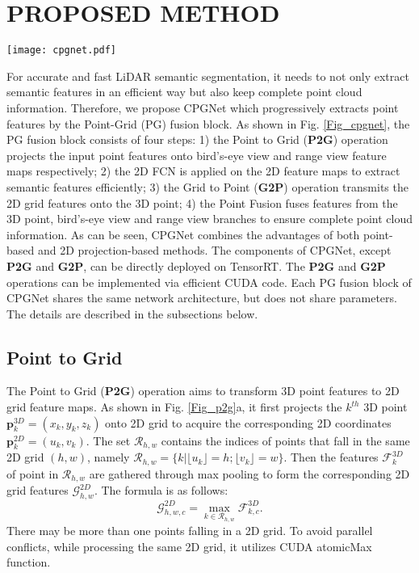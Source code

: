 \documentclass[letterpaper, 10 pt, conference]{ieeeconf}
\begin{document}
\section{PROPOSED METHOD}

\begin{figure*}[t]
\centering
\texttt{[image: cpgnet.pdf]}
\caption{The Point-Grid (PG) fusion block. It takes the point features from the last PG fusion block as input and undergoes the point, bird’s-eye view and range view branches, respectively. The output point features are acquired by fusing features from the three branches.}
\label{Fig_cpgnet}
\end{figure*}

For accurate and fast LiDAR semantic segmentation, it needs to not only extract semantic features in an efficient way but also keep complete point cloud information. Therefore, we propose CPGNet which progressively extracts point features by the Point-Grid (PG) fusion block. As shown in Fig. \ref{Fig_cpgnet}, the PG fusion block consists of four steps: 1) the Point to Grid ({\bf P2G}) operation projects the input point features onto bird’s-eye view and range view feature maps respectively; 2) the 2D FCN is applied on the 2D feature maps to extract semantic features efficiently; 3) the Grid to Point ({\bf G2P}) operation transmits the 2D grid features onto the 3D point; 4) the Point Fusion fuses features from the 3D point, bird’s-eye view and range view branches to ensure complete point cloud information. As can be seen, CPGNet combines the advantages of both point-based and 2D projection-based methods. The components of CPGNet, except {\bf P2G} and {\bf G2P}, can be directly deployed on TensorRT. The {\bf P2G} and {\bf G2P} operations can be implemented via efficient CUDA code. Each PG fusion block of CPGNet shares the same network architecture, but does not share parameters. The details are described in the subsections below.

\subsection{Point to Grid}
The Point to Grid ({\bf P2G}) operation aims to transform 3D point features to 2D grid feature maps. As shown in Fig. \ref{Fig_p2g}a, it first projects the $k^{th}$ 3D point $\boldsymbol{p}_k^{3D}=(x_k,y_k,z_k)$ onto 2D grid to acquire the corresponding 2D coordinates $\boldsymbol{p}_k^{2D}=(u_k,v_k)$. The set $\mathcal{R}_{h,w}$ contains the indices of points that fall in the same 2D grid $(h, w)$, namely $\mathcal{R}_{h,w}=\{k|\lfloor u_k \rfloor = h; \lfloor v_k \rfloor = w \}$. Then the features $\boldsymbol{\mathcal{F}}_k^{3D}$ of point in $\mathcal{R}_{h,w}$ are gathered through max pooling to form the corresponding 2D grid features $\boldsymbol{\mathcal{G}}^{2D}_{h,w}$. The formula is as follows:
\begin{equation}
\boldsymbol{\mathcal{G}}^{2D}_{h,w,c} = \max \limits_{k \in \mathcal{R}_{h,w}} \boldsymbol{\mathcal{F}}^{3D}_{k,c}.
\label{equat_maxpool}
\end{equation}
There may be more than one points falling in a 2D grid. To avoid parallel conflicts, while processing the same 2D grid, it utilizes CUDA atomicMax function.
\end{document}
